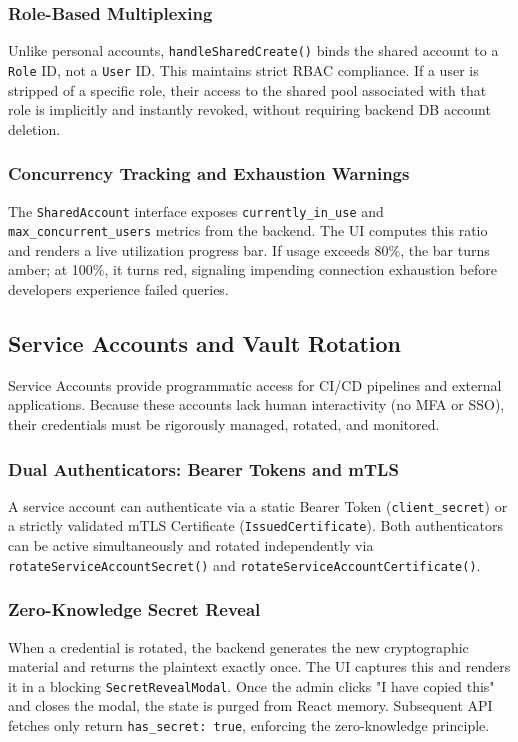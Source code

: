\subsubsection{Role-Based Multiplexing}
Unlike personal accounts, \texttt{handleSharedCreate()} binds the shared account to a \texttt{Role} ID, not a \texttt{User} ID. This maintains strict RBAC compliance. If a user is stripped of a specific role, their access to the shared pool associated with that role is implicitly and instantly revoked, without requiring backend DB account deletion.

\subsubsection{Concurrency Tracking and Exhaustion Warnings}
The \texttt{SharedAccount} interface exposes \texttt{currently\_in\_use} and \texttt{max\_concurrent\_users} metrics from the backend. The UI computes this ratio and renders a live utilization progress bar. If usage exceeds 80\%, the bar turns amber; at 100\%, it turns red, signaling impending connection exhaustion before developers experience failed queries.

\subsection{Service Accounts and Vault Rotation}
Service Accounts provide programmatic access for CI/CD pipelines and external applications. Because these accounts lack human interactivity (no MFA or SSO), their credentials must be rigorously managed, rotated, and monitored.

\subsubsection{Dual Authenticators: Bearer Tokens and mTLS}
A service account can authenticate via a static Bearer Token (\texttt{client\_secret}) or a strictly validated mTLS Certificate (\texttt{IssuedCertificate}). Both authenticators can be active simultaneously and rotated independently via \texttt{rotateServiceAccount\allowbreak Secret()} and \texttt{rotateServiceAccount\allowbreak Certificate()}.

\subsubsection{Zero-Knowledge Secret Reveal}
When a credential is rotated, the backend generates the new cryptographic material and returns the plaintext exactly once. The UI captures this and renders it in a blocking \texttt{SecretRevealModal}. Once the admin clicks "I have copied this" and closes the modal, the state is purged from React memory. Subsequent API fetches only return \texttt{has\_secret: true}, enforcing the zero-knowledge principle.

